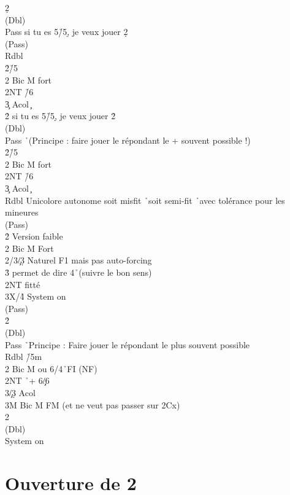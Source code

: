\documentclass[a4paper]{article}
\begin{document}
\begin{bidtable}
2\d\+\\
(Dbl)\+\\
Pass \> si tu es 5\h /5\d , je veux jouer 2\d \+\\
(Pass)\+\\
Rdbl \h \\
2\h {}\h /5\c \\
2\s \> Bic M fort\\
2NT \h /6\c \\
3\c \> Acol \c \-\-\\
2\h \> si tu es 5\h /5\d , je veux jouer 2\h \+\\
(Dbl)\+\\
Pass \h\ (Principe : faire jouer le répondant le + souvent possible !)\\
2\h {}\h /5\c \\
2\s \> Bic M fort\\
2NT \h /6\c \\
3\c \> Acol \c \-\-\\
Rdbl \> Unicolore autonome soit misfit \h\ soit semi-fit \h\ avec tolérance pour les mineures\+\\
(Pass)\+\\
2\h \> Version faible\\
2\s \> Bic M Fort\-\-\\
2\s/3\c/3\d \> Naturel F1 mais pas auto-forcing\\
3\h \> permet de dire 4\h\ (suivre le bon sens)\\
2NT \> fitté\\
3X/4\h \> System on\-\\
(Pass)\+\\
2\h\+\\
(Dbl)\+\\
Pass \h\ Principe : Faire jouer le répondant le plus souvent possible\\
Rdbl \h /5m\\
2\s \> Bic M ou 6\s /4\h\ FI (NF)\\
2NT \h\ + 6\c /6\d \\
3\c/3\d \> Acol\\
3M \> Bic M FM (et ne veut pas passer sur 2Cx)\-\-\\
2\s\+\\
(Dbl)\+\\
System \> on\-\-\-\-
\end{bidtable}

\section{Ouverture de 2\pdfh}
\end{document}
